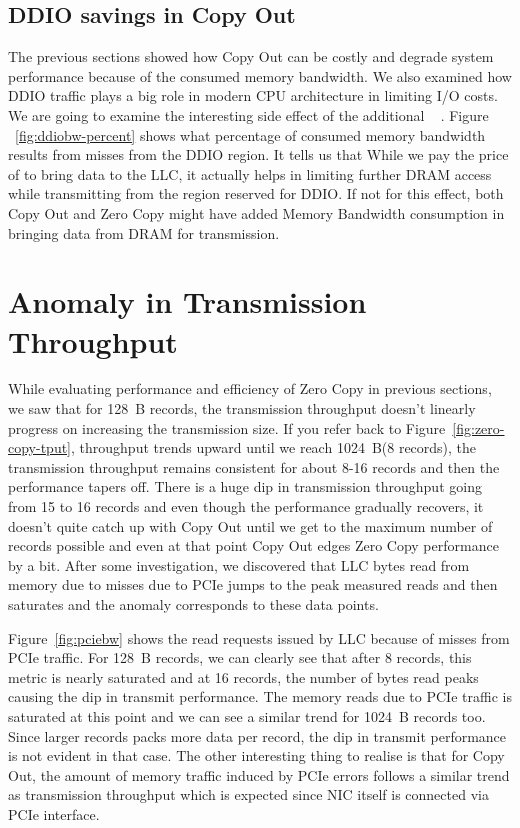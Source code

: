 \subsection{DDIO savings in Copy Out}
\label{sec:ddiobw-savings}
The previous sections showed how Copy Out can be costly and degrade system performance because of the consumed memory bandwidth. We also examined how DDIO traffic plays a big role 
in modern CPU architecture in limiting I/O costs. We are going to examine the interesting side effect of the additional \memcpy~ . Figure ~\ref{fig:ddiobw-percent} shows what percentage of consumed 
memory bandwidth results from misses from the DDIO region. It tells us that While we pay the price of \memcpy to bring data to the LLC, it actually helps in limiting further DRAM access while transmitting 
from the region reserved for DDIO. If not for this effect, both Copy Out and Zero Copy might have added Memory Bandwidth consumption in bringing data from DRAM for transmission. 



\section{Anomaly in Transmission Throughput}
\label{sec:anomaly}
While evaluating performance and efficiency of Zero Copy in previous sections, we saw that for 128~B records, the transmission throughput doesn't linearly progress 
on increasing the transmission size. If you refer back to Figure~\ref{fig:zero-copy-tput}, throughput trends upward until we reach 1024~B(8 records), the transmission throughput remains consistent for about 8-16 records and 
then the performance tapers off. There is a huge dip in transmission throughput going from 15 to 16 records and even though the performance gradually recovers, it doesn't quite 
catch up with Copy Out until we get to the maximum number of records possible and even at that point Copy Out edges Zero Copy performance by a bit. After some investigation, we discovered 
that LLC bytes read from memory due to misses due to PCIe jumps to the peak measured reads and then saturates and the anomaly corresponds to these data points. 

Figure~\ref{fig:pciebw} shows the read requests issued by LLC because of misses from PCIe traffic. For 128~B records, we can clearly see that after 8 records, this metric is 
nearly saturated and at 16 records, the number of bytes read peaks causing the dip in transmit performance. The memory reads due to PCIe traffic is saturated at this point and 
we can see a similar trend for 1024~B records too. Since larger records packs more data per record, the dip in transmit performance is not evident in that case. The other interesting 
thing to realise is that for Copy Out, the amount of memory traffic induced by PCIe errors follows a similar trend as transmission throughput which is expected since 
NIC itself is connected via PCIe interface.


